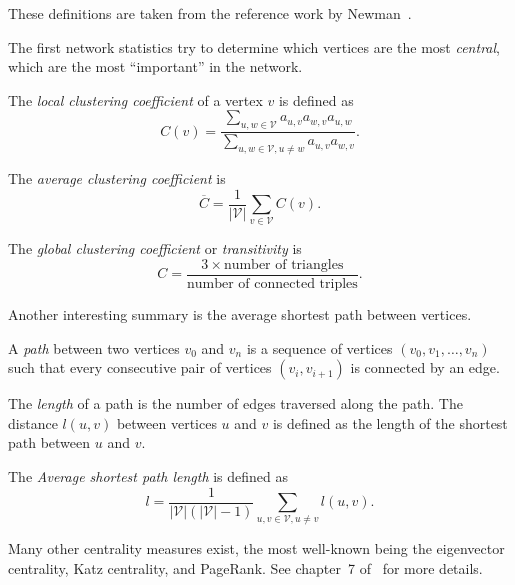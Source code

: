 \documentclass[a4paper,11pt,openany,extrafontsizes]{memoir}
\begin{document}
These definitions are taken from the reference work by
Newman~\cite{newman_networks:_2010}.

The first network statistics try to determine which vertices are the
most \emph{central}, which are the most ``important'' in the network.

\begin{defn}
  The \emph{local clustering coefficient} of a vertex $v$ is defined as
  \[ C(v) = \frac{\sum_{u,w\in \mathcal{V}}
      a_{u,v}a_{w,v}a_{u,w}}{\sum_{u,w\in \mathcal{V}, u\neq w}
      a_{u,v}a_{w,v}}. \]

  The \emph{average clustering coefficient} is
  \[ \overline{C} = \frac{1}{\left|\mathcal{V}\right|}
    \sum_{v\in\mathcal{V}} C(v). \]
\end{defn}

\begin{defn}
  The \emph{global clustering coefficient} or \emph{transitivity} is
  \[ C = \frac{3\times\text{number of triangles}}{\text{number of
        connected triples}}. \]
\end{defn}

Another interesting summary is the average shortest path between
vertices.

\begin{defn}[Path]
  A \emph{path} between two vertices $v_0$ and $v_n$ is a sequence of
  vertices $(v_0, v_1, \ldots, v_n)$ such that every consecutive pair
  of vertices $(v_i, v_{i+1})$ is connected by an edge.

  The \emph{length} of a path is the number of edges traversed along
  the path. The distance $l(u,v)$ between vertices $u$ and $v$ is
  defined as the length of the shortest path between $u$ and $v$.
\end{defn}

\begin{defn}
  The \emph{Average shortest path length} is defined as
  \[ l =
    \frac{1}{\left|\mathcal{V}\right|(\left|\mathcal{V}\right|-1)}
    \sum_{u,v \in\mathcal{V}, u\neq v} l(u,v). \]
\end{defn}

Many other centrality measures exist, the most well-known being the
eigenvector centrality, Katz centrality, and PageRank. See chapter~7
of~\cite{newman_networks:_2010} for more details.

\end{document}
